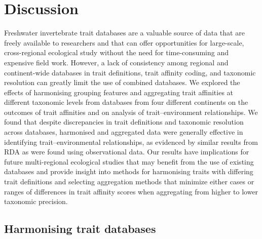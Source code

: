 \documentclass[12pt]{article}
\begin{document}
\newpage


\section*{Discussion}


Freshwater invertebrate trait databases are a valuable source of data that are freely available to researchers and that can offer opportunities for large-scale, cross-regional ecological study without the need for time-consuming and expensive field work. However, a lack of consistency among regional and continent-wide databases in trait definitions, trait affinity coding, and taxonomic resolution can greatly limit the use of combined databases. We explored the effects of harmonising grouping features and aggregating trait affinities at different taxonomic levels from databases from four different continents on the outcomes of trait affinities and on analysis of trait–environment relationships. We found that despite discrepancies in trait definitions and taxonomic resolution across databases, harmonised and aggregated data were generally effective in identifying trait–environmental relationships, as evidenced by similar results from RDA as were found using observational data. Our results have implications for future multi-regional ecological studies that may benefit from the use of existing databases and provide insight into methods for harmonising traits with differing trait definitions and selecting aggregation methods that minimize either cases or ranges of differences in trait affinity scores when aggregating from higher to lower taxonomic precision.

\subsection*{Harmonising trait databases}
\end{document}
